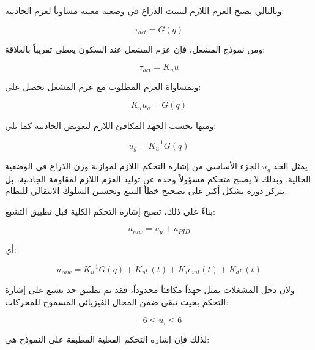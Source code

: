 وبالتالي يصبح العزم اللازم لتثبيت الذراع في وضعية معينة مساوياً لعزم الجاذبية:

\begin{equation}
\tau_{act}=G(q)
\label{eq:pid_static_gravity_torque}
\end{equation}

ومن نموذج المشغل، فإن عزم المشغل عند السكون يعطى تقريباً بالعلاقة:

\begin{equation}
\tau_{act}=K_u u
\label{eq:pid_static_actuator_model}
\end{equation}

وبمساواة العزم المطلوب مع عزم المشغل نحصل على:

\begin{equation}
K_u u_g = G(q)
\label{eq:pid_gravity_voltage_balance}
\end{equation}

ومنها يحسب الجهد المكافئ اللازم لتعويض الجاذبية كما يلي:

\begin{equation}
u_g=K_u^{-1}G(q)
\label{eq:pid_gravity_compensation_voltage}
\end{equation}

يمثل الحد \(u_g\) الجزء الأساسي من إشارة التحكم اللازم لموازنة وزن الذراع في الوضعية الحالية. وبذلك لا يصبح متحكم  مسؤولاً وحده عن توليد العزم اللازم لمقاومة الجاذبية، بل يتركز دوره بشكل أكبر على تصحيح خطأ التتبع وتحسين السلوك الانتقالي للنظام.

بناءً على ذلك، تصبح إشارة التحكم الكلية قبل تطبيق التشبع:

\begin{equation}
u_{raw}
=
u_g
+
u_{PID}
\label{eq:pid_raw_control_signal}
\end{equation}

أي:

\begin{equation}
u_{raw}
=
K_u^{-1}G(q)
+
K_p e(t)
+
K_i e_{int}(t)
+
K_d \dot{e}(t)
\label{eq:pid_full_control_law}
\end{equation}

ولأن دخل المشغلات يمثل جهداً مكافئاً محدوداً، فقد تم تطبيق حد تشبع على إشارة التحكم بحيث تبقى ضمن المجال الفيزيائي المسموح للمحركات:

\begin{equation}
-6 \leq u_i \leq 6
\label{eq:pid_voltage_limit}
\end{equation}

لذلك فإن إشارة التحكم الفعلية المطبقة على النموذج هي:

